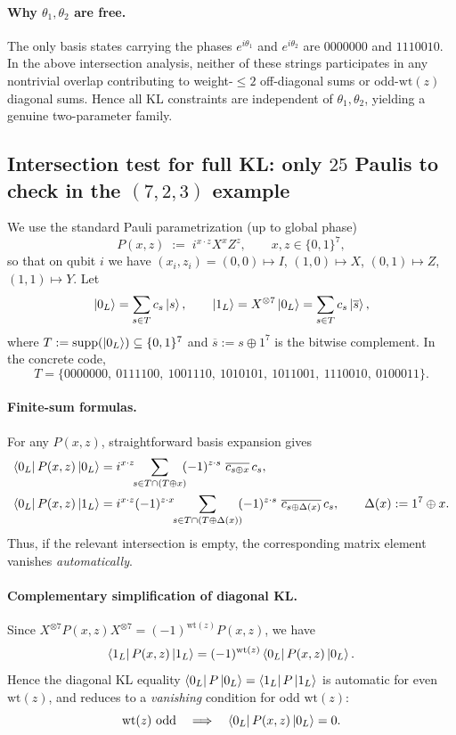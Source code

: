 \documentclass[11pt]{article}
\begin{document}
\paragraph{Why $\theta_1,\theta_2$ are free.}
The only basis states carrying the phases $e^{i\theta_1}$ and $e^{i\theta_2}$ are $0000000$ and $1110010$.
In the above intersection analysis, neither of these strings participates in any nontrivial overlap contributing to
weight-$\le 2$ off-diagonal sums or odd-$\mathrm{wt}(z)$ diagonal sums. Hence all KL constraints are independent of
$\theta_1,\theta_2$, yielding a genuine two-parameter family.

\subsection{Intersection test for full KL: only $25$ Paulis to check in the $(7,2,3)$ example}
\label{subsec:intersection-test-25}

We use the standard Pauli parametrization (up to global phase)
\[
P(x,z)\;:=\; i^{x\cdot z} X^x Z^z,\qquad x,z\in\{0,1\}^7,
\]
so that on qubit $i$ we have $(x_i,z_i)=(0,0)\mapsto I$, $(1,0)\mapsto X$, $(0,1)\mapsto Z$, $(1,1)\mapsto Y$.
Let
\[
\ket{0_L}=\sum_{s\in T} c_s \ket{s},
\qquad
\ket{1_L}=X^{\otimes 7}\ket{0_L}=\sum_{s\in T} c_s \ket{\overline{s}},
\]
where $T:=\mathrm{supp}(\ket{0_L})\subseteq\{0,1\}^7$ and $\overline{s}:=s\oplus 1^7$ is the bitwise complement.
In the concrete code,
\[
T=\{0000000,\ 0111100,\ 1001110,\ 1010101,\ 1011001,\ 1110010,\ 0100011\}.
\]

\paragraph{Finite-sum formulas.}
For any $P(x,z)$, straightforward basis expansion gives
\begin{align}
\bra{0_L}P(x,z)\ket{0_L}
&=
i^{x\cdot z}\!\!\sum_{s\in T\cap(T\oplus x)}\!\!
(-1)^{z\cdot s}\ \overline{c_{s\oplus x}}\,c_s,
\label{eq:diag-intersection}\\
\bra{0_L}P(x,z)\ket{1_L}
&=
i^{x\cdot z}(-1)^{z\cdot x}\!\!\sum_{s\in T\cap(T\oplus \Delta(x))}\!\!
(-1)^{z\cdot s}\ \overline{c_{s\oplus \Delta(x)}}\,c_s,
\qquad \Delta(x):=1^7\oplus x .
\label{eq:offdiag-intersection}
\end{align}
Thus, if the relevant intersection is empty, the corresponding matrix element vanishes \emph{automatically}.

\paragraph{Complementary simplification of diagonal KL.}
Since $X^{\otimes 7} P(x,z) X^{\otimes 7}=(-1)^{\mathrm{wt}(z)}P(x,z)$, we have
\[
\bra{1_L}P(x,z)\ket{1_L}=(-1)^{\mathrm{wt}(z)}\bra{0_L}P(x,z)\ket{0_L}.
\]
Hence the diagonal KL equality $\bra{0_L}P\ket{0_L}=\bra{1_L}P\ket{1_L}$ is automatic for even $\mathrm{wt}(z)$,
and reduces to a \emph{vanishing} condition for odd $\mathrm{wt}(z)$:
\begin{equation}
\mathrm{wt}(z)\ \text{odd}\quad\Longrightarrow\quad \bra{0_L}P(x,z)\ket{0_L}=0.
\label{eq:oddz-vanish}
\end{equation}
\end{document}
